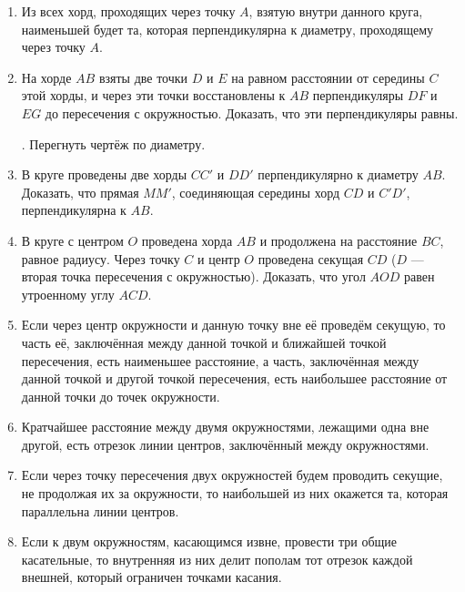 \documentclass[twoside]{book}
\begin{document}
\begin{center}
\end{center}

\begin{enumerate}[resume]


 \item
Из всех хорд, проходящих через точку $A$, взятую внутри данного круга, наименьшей будет та, которая перпендикулярна к диаметру, проходящему через точку $A$.

 \item
На хорде $AB$ взяты две точки $D$ и $E$ на равном расстоянии от середины $C$ этой хорды, и через эти точки восстановлены к $AB$ перпендикуляры $DF$ и $EG$ до пересечения с окружностью.
Доказать, что эти перпендикуляры равны.

\smallskip
{}.
Перегнуть чертёж по диаметру.

 \item
В круге проведены две хорды $CC'$ и $DD'$ перпендикулярно к диаметру $AB$.
Доказать, что прямая $MM'$, соединяющая середины хорд $CD$ и $C'D'$, перпендикулярна к $AB$.

 \item
В круге с центром $O$ проведена хорда $AB$ и продолжена на расстояние $BC$, равное радиусу.
Через точку $C$ и центр $O$ проведена секущая $CD$ ($D$ — вторая точка пересечения с окружностью).
Доказать, что угол $AOD$ равен утроенному углу $ACD$.

 \item
Если через центр окружности и данную точку вне её проведём секущую, то часть её, заключённая между данной точкой и ближайшей точкой пересечения, есть наименьшее расстояние, а часть, заключённая между данной точкой и другой точкой пересечения, есть наибольшее расстояние от данной точки до точек окружности.

 \item
Кратчайшее расстояние между двумя окружностями, лежащими одна вне другой, есть отрезок линии центров, заключённый между окружностями.

 \item
Если через точку пересечения двух окружностей будем проводить секущие, не продолжая их за окружности, то наибольшей из них окажется та, которая параллельна линии центров.

 \item
Если к двум окружностям, касающимся извне, провести три общие касательные, то внутренняя из них делит пополам тот отрезок каждой внешней, который ограничен точками касания.


\end{enumerate}
\end{document}
